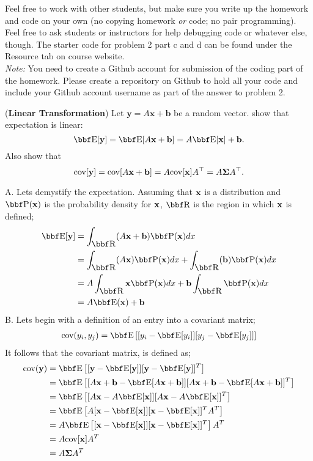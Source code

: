 \documentclass[12pt,letterpaper]{hmcpset}
\renewcommand{\cov}{\text{cov}}
\begin{document}
Feel free to work with other students, but make sure you write up the homework
and code on your own (no copying homework \textit{or} code; no pair programming).
Feel free to ask students or instructors for help debugging code or whatever else,
though.
The starter code for problem 2 part c and d can be found under the Resource tab on course website.\\

\textit{Note:} You need to create a Github account for submission of the coding part of the homework. Please create a repository on Github to hold all your code and include your Github account username as part of the answer to problem 2.

\begin{problem}[1]
(\textbf{Linear Transformation}) Let $\mathbf{y} = A\mathbf{x} + \mathbf{b}$ be a random vector.
show that expectation is linear:
\[
    \EE[\yy] = \EE[A\xx + \bb] = A\EE[\xx] + \bb.
\]
Also show that
\[
    \cov[\yy] = \cov[A\xx + \bb] = A \cov[\xx] A^\T = A\Sigmab A^\T.
\]
\end{problem}
\begin{solution}
  A. Lets demystify the expectation. Assuming that ${\bf x}$ is a distribution and $\PP (\xx)$ is the probability density  for ${\bf x}$, $\RR$ is the region in which ${\bf x}$ is defined; 
   \begin{align}
   \EE [\yy] &= \int_{\RR} (A\xx+\bb)\PP(\xx)dx  \\
   &= \int_{\RR}(A\xx)\PP(\xx)dx+ \int_{\RR}(\bb)\PP(\xx)dx\\
   &= A\int_{\RR}\xx\PP(\xx)dx + \bb \int_{\RR}\PP(\xx)dx\\
   &= A\EE(\xx)+\bb
   \end{align}
B. Lets begin with a definition of an entry into a covariant matrix; 
\begin{align*}
\cov(y_i,y_j)= \EE\left[[y_i-\EE[y_i]][y_j-\EE[y_j]]\right]
\end{align*}
It follows that the covariant matrix, is defined as;
\begin{align*}
\cov(\yy)&= \EE\left[[\yy-\EE[\yy]][\yy-\EE[\yy]]^T\right]\\
&= \EE\left[[A\xx + \bb-\EE[A\xx + \bb]][A\xx + \bb-\EE[A\xx + \bb]]^T\right]\\
&=\EE\left[[A\xx -A\EE[\xx]][A\xx -A\EE[\xx ]]^T\right]\\
&=\EE\left[A[\xx-\EE[\xx]][\xx-\EE[\xx]]^TA^T\right]\\
&=A\EE\left[[\xx-\EE[\xx]][\xx-\EE[\xx]]^T\right]A^T\\
&= A\cov[\xx]A^T\\
&=A\Sigmab A^T
\end{align*}

   \end{solution}
\end{document}
